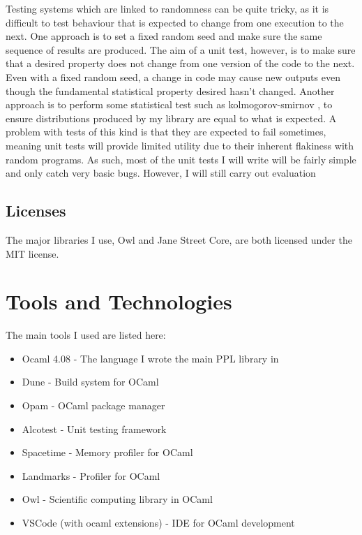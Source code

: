 Testing systems which are linked to randomness can be quite tricky, as it is difficult to test behaviour that is expected to change from one execution to the next. One approach is to set a fixed random seed and make sure the same sequence of results are produced. The aim of a unit test, however, is to make sure that a desired property does not change from one version of the code to the next. Even with a fixed random seed, a change in code may cause new outputs even though the fundamental statistical property desired hasn't changed. Another approach is to perform some statistical test such as kolmogorov-smirnov \cite{}, to ensure distributions produced by my library are equal to what is expected. A problem with tests of this kind is that they are expected to fail sometimes, meaning unit tests will provide limited utility due to their inherent flakiness with random programs. As such, most of the unit tests I will write will be fairly simple and only catch very basic bugs. However, I will still carry out evaluation 

\subsection{Licenses}

The major libraries I use, Owl and Jane Street Core, are both licensed under the MIT license.

\section{Tools and Technologies}
The main tools I used are listed here:
\begin{itemize}
    \item Ocaml 4.08 - The language I wrote the main PPL library in
    \item Dune - Build system for OCaml
    \item Opam - OCaml package manager
    \item Alcotest - Unit testing framework
    \item Spacetime - Memory profiler for OCaml
    \item Landmarks - Profiler for OCaml
    \item Owl - Scientific computing library in OCaml
    \item VSCode (with ocaml extensions) - IDE for OCaml development
\end{itemize}

